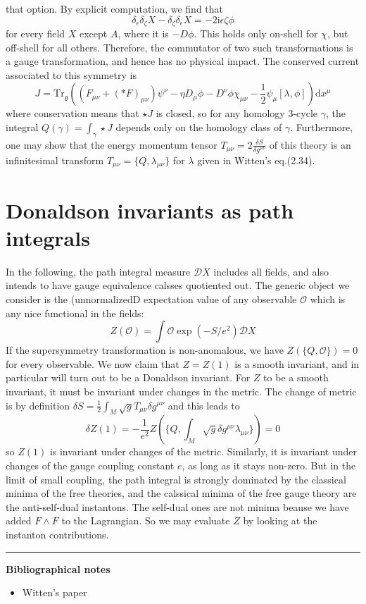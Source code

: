that option. By explicit computation, we find that 
\[
	\delta_\epsilon\delta_\zeta X - \delta_\zeta\delta_\epsilon X =
	-2\mathrm{i}\epsilon\zeta\phi
\] 
for every field $X$ except  $A$, where it is  $-D\phi$. This holds only on-shell
for  $\chi$, but off-shell for all others. Therefore, the commutator of two such
transformations is a gauge transformation, and hence has no physical impact. The
conserved current associated to this symmetry is 
 \[
	 J = \mathrm{Tr}_\mathfrak{g}\left((F_{\mu\nu} + (\ast F)_{\mu\nu})\psi^\nu
		 - \eta D_\mu \phi - D^\nu\phi \chi_{\mu\nu} -
	 \frac{1}{2}\psi_\mu[\lambda,\phi]\right)\mathrm{d}x^\mu
\] 
where conservation means that $\star J$ is closed, so for any homology 3-cycle
 $\gamma$, the integral  $Q(\gamma) = \int_\gamma \star J$ depends only on the
 homology class of  $\gamma$. Furthermore, one may show that the energy momentum
 tensor  $T_{\mu\nu}= 2 \frac{\delta S}{\delta g^{\mu\nu}}$ of this theory is an
 infinitesimal transform $T_{\mu\nu}=\{Q,\lambda_{\mu\nu}\}$ for $\lambda$ given
 in Witten's eq.(2.34). 

\section{Donaldson invariants as path integrals}
In the following, the path integral measure $\mathcal{D}X$ includes all fields,
and also intends to have gauge equivalence calsses quotiented out. The generic
object we consider is the (unnormalizedD expectation value of any observable
$\mathcal{O}$ which is any nice functional in the fields:
\[
Z(\mathcal{O}) = \int \mathcal{O} \exp(-S /e^2) \mathcal{D}X
\] 
If the supersymmetry transformation is non-anomalous, we have
$Z(\{Q,\mathcal{O}\})= 0$ for every observable. We now claim that $Z=Z(1)$ is a
smooth invariant, and in particular will turn out to be a Donaldson invariant.
For  $Z$ to be a smooth invariant, it must be invariant under changes in the
metric. The change of metric is by definition  $\delta
S=\frac{1}{2}\int_M\sqrt{g} T_{\mu\nu}\delta g^{\mu\nu}$ and this leads to
\[
	\delta Z(1) = -\frac{1}{e^2}Z(\{Q,\int_M \sqrt{g}\delta
	g^{\mu\nu}\lambda_{\mu\nu}\}) = 0
\] 
so $Z(1)$ is invariant under changes of the metric. Similarly, it is invariant
under changes of the gauge coupling constant  $e$,   as long as it stays
non-zero. But in the limit of small coupling, the path integral is strongly
dominated by the classical minima of the free theories, and the calssical minima
of the free gauge theory are the anti-self-dual instantons. The self-dual ones
are not minima beause we have added $F\wedge F$ to the Lagrangian. So we may
evaluate  $Z$ by looking at the instanton contributions. 




\vspace{5mm}
\hrule 
\vspace{5mm}

\textbf{Bibliographical notes}
{\small
\begin{itemize}
	\item Witten's paper
\end{itemize}
}


